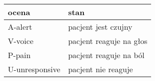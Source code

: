 \begin{table}[htbp]
\begin{tabular}{|l|l|}
\hline
ocena          & stan                    \\ \hline
A-alert        & pacjent jest czujny     \\ \hline
V-voice        & pacjent reaguje na głos \\ \hline
P-pain         & pacjent reaguje na ból  \\ \hline
U-unresponsive & pacjent nie reaguje     \\ \hline
\end{tabular}
\end{table}